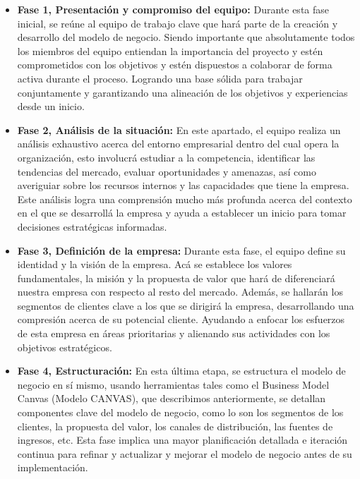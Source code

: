 \begin{itemize}
	\item \textbf{Fase 1, Presentación y compromiso del equipo:} Durante esta fase inicial, se reúne al equipo de trabajo clave que hará parte de la creación y desarrollo del modelo de negocio. Siendo importante que absolutamente todos los miembros del equipo entiendan la importancia del proyecto y estén comprometidos con los objetivos y estén dispuestos a colaborar de forma activa durante el proceso. Logrando una base sólida para trabajar conjuntamente y garantizando una alineación de los objetivos y experiencias desde un inicio.
	
	\item \textbf{Fase 2, Análisis de la situación:} En este apartado, el equipo realiza un análisis exhaustivo acerca del entorno empresarial dentro del cual opera la organización, esto involucrá estudiar a la competencia, identificar las tendencias del mercado, evaluar oportunidades y amenazas, así como averiguiar sobre los recursos internos y las capacidades que tiene la empresa. Este análisis logra una comprensión mucho más profunda acerca del contexto en el que se desarrollá la empresa y ayuda a establecer un inicio para tomar decisiones estratégicas informadas.
	
	\item \textbf{Fase 3, Definición de la empresa:} Durante esta fase, el equipo define su identidad y la visión de la empresa. Acá se establece los valores fundamentales, la misión y la propuesta de valor que hará de diferenciará nuestra empresa con respecto al resto del mercado. Además, se hallarán los segmentos de clientes clave a los que se dirigirá la empresa, desarrollando una compresión acerca de su potencial cliente. Ayudando a enfocar los esfuerzos de esta empresa en áreas prioritarias y alienando sus actividades con los objetivos estratégicos.
	
	\item \textbf{Fase 4, Estructuración:} En esta última etapa, se estructura el modelo de negocio en sí mismo, usando herramientas tales como el Business Model Canvas (Modelo CANVAS), que describimos anteriormente, se detallan componentes clave del modelo de negocio, como lo son los segmentos de los clientes, la propuesta del valor, los canales de distribución, las fuentes de ingresos, etc. Esta fase implica una mayor planificación detallada e iteración continua para refinar y actualizar y mejorar el modelo de negocio antes de su implementación.
\end{itemize}